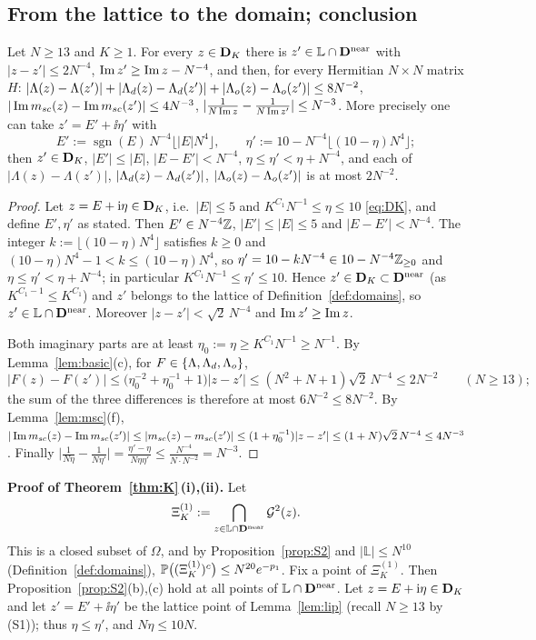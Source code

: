 \subsection{From the lattice to the domain; conclusion}
\begin{lemma}\label{lem:lip}
Let $N\ge13$ and $K\ge1$. For every $z\in\mathbf{D}_K$ there is $z'\in\mathbb L\cap\mathbf{D}^{\rm near}$ with $|z-z'|\le2N^{-4}$, $\operatorname{Im} z'\ge\operatorname{Im} z-N^{-4}$, and then, for every Hermitian $N\times N$ matrix $H$:
$|\Lambda(z)-\Lambda(z')|+|\Lambda_d(z)-\Lambda_d(z')|+|\Lambda_o(z)-\Lambda_o(z')|\le8N^{-2}$, $|\operatorname{Im}m_{sc}(z)-\operatorname{Im}m_{sc}(z')|\le4N^{-3}$, $|\frac1{N\operatorname{Im} z}-\frac1{N\operatorname{Im} z'}|\le N^{-3}$.
More precisely one can take $z'=E'+\ii\eta'$ with
\[
 E':=\operatorname{sgn}(E)\,N^{-4}\lfloor|E|N^4\rfloor,\qquad\eta':=10-N^{-4}\lfloor(10-\eta)N^4\rfloor ;
\]
then $z'\in\mathbf{D}_K$, $|E'|\le|E|$, $|E-E'|<N^{-4}$, $\eta\le\eta'<\eta+N^{-4}$, and each of $|\Lambda(z)-\Lambda(z')|$, $|\Lambda_d(z)-\Lambda_d(z')|$, $|\Lambda_o(z)-\Lambda_o(z')|$ is at most $2N^{-2}$.
\end{lemma}
\begin{proof}
Let $z=E+\mathrm{i}\eta\in\mathbf{D}_K$, i.e.\ $|E|\le5$ and $K^{C_1}N^{-1}\le\eta\le10$ \eqref{eq:DK}, and define $E',\eta'$ as stated. Then $E'\in N^{-4}\mathbb{Z}$, $|E'|\le|E|\le5$ and $|E-E'|<N^{-4}$.
The integer $k:=\lfloor(10-\eta)N^4\rfloor$ satisfies $k\ge0$ and $(10-\eta)N^4-1<k\le(10-\eta)N^4$, so $\eta'=10-kN^{-4}\in10-N^{-4}\mathbb{Z}_{\ge0}$ and $\eta\le\eta'<\eta+N^{-4}$; in particular $K^{C_1}N^{-1}\le\eta'\le10$.
Hence $z'\in\mathbf{D}_K\subset\mathbf{D}^{\rm near}$ (as $K^{C_1-1}\le K^{C_1}$) and $z'$ belongs to the lattice of Definition~\ref{def:domains}, so $z'\in\mathbb L\cap\mathbf{D}^{\rm near}$. Moreover $|z-z'|<\sqrt2\,N^{-4}$ and $\operatorname{Im} z'\ge\operatorname{Im} z$.

Both imaginary parts are at least $\eta_0:=\eta\ge K^{C_1}N^{-1}\ge N^{-1}$. By Lemma~\ref{lem:basic}(c), for $F\in\{\Lambda,\Lambda_d,\Lambda_o\}$,
\[
 |F(z)-F(z')|\le\big(\eta_0^{-2}+\eta_0^{-1}+1\big)|z-z'|\le(N^2+N+1)\sqrt2\,N^{-4}\le2N^{-2}\qquad(N\ge13);
\]
the sum of the three differences is therefore at most $6N^{-2}\le8N^{-2}$. By Lemma~\ref{lem:msc}(f), $|\operatorname{Im}m_{sc}(z)-\operatorname{Im}m_{sc}(z')|\le|m_{sc}(z)-m_{sc}(z')|\le(1+\eta_0^{-1})|z-z'|\le(1+N)\sqrt2\,N^{-4}\le4N^{-3}$.
Finally $\big|\frac1{N\eta}-\frac1{N\eta'}\big|=\frac{\eta'-\eta}{N\eta\eta'}\le\frac{N^{-4}}{N\cdot N^{-2}}=N^{-3}$.
\end{proof}

\medskip\noindent\textbf{Proof of Theorem~\ref{thm:K}\,(i),(ii).} Let
\[
 \Xi_K^{(1)}:=\bigcap_{z\in\mathbb L\cap\mathbf{D}^{\rm near}}\mathcal{G}^2(z).
\]
This is a closed subset of $\Omega$, and by Proposition~\ref{prop:S2} and $|\mathbb L|\le N^{10}$ (Definition~\ref{def:domains}), $\mathbb{P}\big((\Xi_K^{(1)})^c\big)\le N^{20}e^{-p_1}$. Fix a point of $\Xi_K^{(1)}$. Then Proposition~\ref{prop:S2}(b),(c) hold at all points of $\mathbb L\cap\mathbf{D}^{\rm near}$.
Let $z=E+\mathrm{i}\eta\in\mathbf{D}_K$ and let $z'=E'+\ii\eta'$ be the lattice point of Lemma~\ref{lem:lip} (recall $N\ge13$ by (S1)); thus $\eta\le\eta'$, and $N\eta\le10N$.


